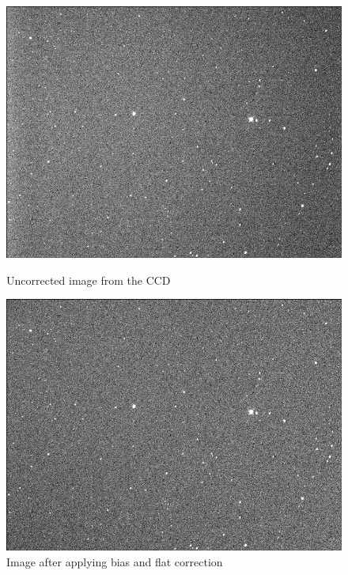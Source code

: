 \begin{figure}[ht]
    \centering
    \begin{minipage}[b]{\figwidth}
        \centering
        \includegraphics[width=\textwidth]{images/raw_image.png}
        \caption{Uncorrected image from the CCD}
        \label{fig:raw_image}
    \end{minipage}\quad\quad
    \begin{minipage}[b]{\figwidth}
        \includegraphics[width=\textwidth]{images/corrected_image.png}
        \caption{Image after applying bias and flat correction}
        \label{fig:corected_image}
    \end{minipage}
\end{figure}

